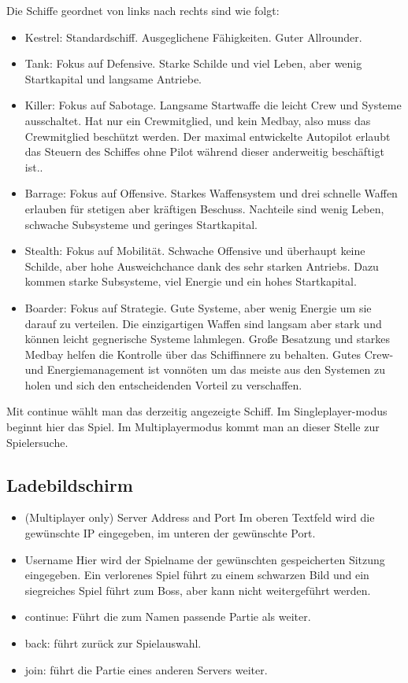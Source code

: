 \documentclass[fontsize=12pt,paper=a4,twoside]{scrartcl}
\begin{document}
Die Schiffe geordnet von links nach rechts sind wie folgt:
\begin{itemize}
\item Kestrel: Standardschiff. Ausgeglichene Fähigkeiten. Guter Allrounder.
\item Tank: Fokus auf Defensive. Starke Schilde und viel Leben, aber wenig Startkapital und langsame Antriebe.
\item Killer: Fokus auf Sabotage. Langsame Startwaffe die leicht Crew und Systeme ausschaltet. Hat nur ein Crewmitglied, und kein Medbay, also muss das Crewmitglied beschützt werden. Der maximal entwickelte Autopilot erlaubt das Steuern des Schiffes ohne Pilot während dieser anderweitig beschäftigt ist..
\item Barrage: Fokus auf Offensive. Starkes Waffensystem und drei schnelle Waffen erlauben für stetigen aber kräftigen Beschuss. Nachteile sind wenig Leben, schwache Subsysteme und geringes Startkapital.
\item Stealth: Fokus auf Mobilität. Schwache Offensive und überhaupt keine Schilde, aber hohe Ausweichchance dank des sehr starken Antriebs. Dazu kommen starke Subsysteme, viel Energie und ein hohes Startkapital.
\item Boarder: Fokus auf Strategie. Gute Systeme, aber wenig Energie um sie darauf zu verteilen. Die einzigartigen Waffen sind langsam aber stark und können leicht gegnerische Systeme lahmlegen. Große Besatzung und starkes Medbay helfen die Kontrolle über das Schiffinnere zu behalten. Gutes Crew- und Energiemanagement ist vonnöten um das meiste aus den Systemen zu holen und sich den entscheidenden Vorteil zu verschaffen.

\end {itemize}
Mit continue wählt man das derzeitig angezeigte Schiff. Im Singleplayer-modus beginnt hier das Spiel. Im Multiplayermodus kommt man an dieser Stelle zur Spielersuche.

\subsection{Ladebildschirm}
\begin{itemize}
\item (Multiplayer only) Server Address and Port
Im oberen Textfeld wird die gewünschte IP eingegeben, im unteren der gewünschte Port.
\item Username Hier wird der Spielname der gewünschten gespeicherten Sitzung eingegeben. Ein verlorenes Spiel führt zu einem schwarzen Bild und ein siegreiches Spiel führt zum Boss, aber kann nicht weitergeführt werden.
\item continue: Führt die zum Namen passende Partie als weiter.
\item back: führt zurück zur Spielauswahl.
\item join: führt die Partie eines anderen Servers weiter.
\end{itemize}
\end{document}
